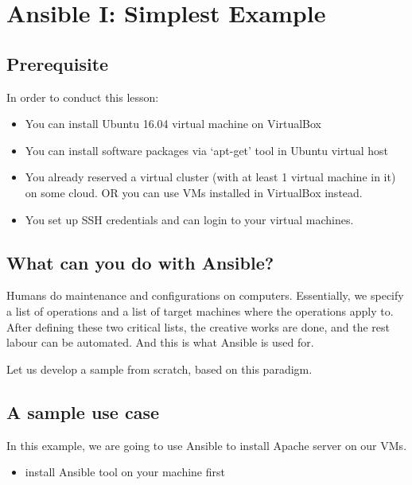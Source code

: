 \section{Ansible I: Simplest Example}\label{ansible-i-simplest-example}

\subsection{Prerequisite}\label{prerequisite}

In order to conduct this lesson:

\begin{itemize}
\item
  You can install Ubuntu 16.04 virtual machine on VirtualBox
\item
  You can install software packages via `apt-get' tool in Ubuntu virtual
  host
\item
  You already reserved a virtual cluster (with at least 1 virtual
  machine in it) on some cloud. OR you can use VMs installed in
  VirtualBox instead.
\item
  You set up SSH credentials and can login to your virtual machines.
\end{itemize}

\subsection{What can you do with
Ansible?}\label{what-can-you-do-with-ansible}

Humans do maintenance and configurations on computers. Essentially, we
specify a list of operations and a list of target machines where the
operations apply to. After defining these two critical lists, the
creative works are done, and the rest labour can be automated. And this
is what Ansible is used for.

Let us develop a sample from scratch, based on this paradigm.

\subsection{A sample use case}\label{a-sample-use-case}

In this example, we are going to use Ansible to install Apache server on
our VMs.

\begin{itemize}
\tightlist
\item
  install Ansible tool on your machine first
\end{itemize}

